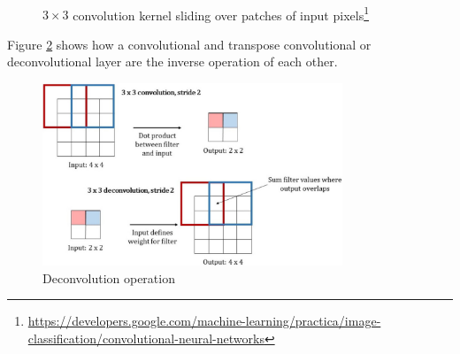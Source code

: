 \documentclass[report.tex]{subfiles}
\begin{document}
\begin{figure}[ht]
	\centering
        \begin{minipage}{1.\textwidth}
		\renewcommand\footnoterule{} %
		\renewcommand{\thempfootnote}{\fnsymbol{mpfootnote}}
		\centering
		\\
		\caption[$3 \times 3$ convolution kernel sliding over patches of input pixels]{$3 \times 3$ convolution kernel sliding over patches of input pixels\footnote[1]{\url{https://developers.google.com/machine-learning/practica/image-classification/convolutional-neural-networks}}}
		\label{fig:cnnbasic}
	\end{minipage}
\end{figure}

Figure \ref{fig:convtranspose} shows how a convolutional and transpose convolutional or deconvolutional layer are the inverse operation of each other.

\begin{figure}[ht]
	\centering
	\includegraphics[width=0.8\textwidth]{./images-neural/convtranspose.png}
	\caption{Deconvolution operation \parencite[11]{convtranspose}}
	\label{fig:convtranspose}
\end{figure}
\end{document}
